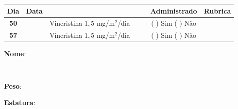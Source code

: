 \documentclass[11pt,a4paper,oldfontcommands]{memoir}
\def\entrywithlabel[#1]#2{\parbox{#1}{{\small #2:} \hrulefill}}
\begin{document}
\begin{center}
\begin{table}[H]
\begin{tabular}{p{1cm}c|p{4.6cm}|p{1.4cm}p{1.4cm}|c|c}
    \hline
\end{tabular}
\end{table}
\begin{table}[H] \small
\begin{tabular}{p{1cm}c|p{4.6cm}|p{2cm}p{2cm}|c|c}
	\hline
	\multicolumn{1}{c|}{\multirow{1}{*}{\textbf{Dia}}}&{Data}&{}&{}&&{Administrado}&{Rubrica} \\
    \hline
    \multicolumn{1}{c|}{\textbf{50}}&&{Vincristina \(1,5\) mg/m\(^2\)/dia}&\multicolumn{1}{c}{}&&{(  ) Sim (  ) Não}&\\
    \hline
    \multicolumn{1}{c|}{\textbf{57}}&&{Vincristina \(1,5\) mg/m\(^2\)/dia}&\multicolumn{1}{c}{}&&{(  ) Sim (  ) Não}&\\
    \hline
\end{tabular}
\end{table}
\pagebreak
    \noindent
\entrywithlabel[1\hsize]{\textbf{Nome}}\hfill
\\[0.3cm]
\entrywithlabel[.45\hsize]{\textbf{Peso}}\hfill  \entrywithlabel[.45\hsize]{\textbf{Estatura}}


\end{center}
\end{document}

